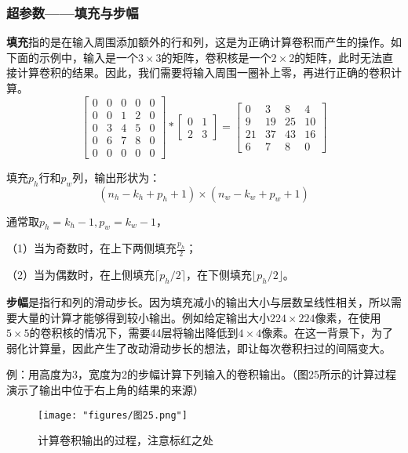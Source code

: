 \subsubsection{超参数——填充与步幅}
\textbf{填充}指的是在输入周围添加额外的行和列，这是为正确计算卷积而产生的操作。如下面的示例中，输入是一个$3\times3$的矩阵，卷积核是一个$2\times2$的矩阵，此时无法直接计算卷积的结果。因此，我们需要将输入周围一圈补上零，再进行正确的卷积计算。
\begin{equation}\begin{bmatrix}0&0&0&0&0\\0&0&1&2&0\\0&3&4&5&0\\0&6&7&8&0\\0&0&0&0&0\end{bmatrix}*\begin{bmatrix}0&1\\2&3\end{bmatrix}=\begin{bmatrix}0&3&8&4\\9&19&25&10\\21&37&43&16\\6&7&8&0\end{bmatrix}\end{equation}

填充$p_{h}$行和$p_{w}$列，输出形状为：
\begin{equation}(n_h-k_h+p_h+1)\times(n_w-k_w+p_w+1)\end{equation}

通常取$p_{h}=k_{h}-1 ,p_{w}=k_{w}-1$，

（1）当为奇数时，在上下两侧填充$\frac{p_{h}}2$；

（2）当为偶数时，在上侧填充$\lceil p_{h}/2\rceil $，在下侧填充$\lfloor p_{h}/2\rfloor $。

\textbf{步幅}是指行和列的滑动步长。因为填充减小的输出大小与层数呈线性相关，所以需要大量的计算才能够得到较小输出。例如给定输出大小$224\times224$像素，在使用$5\times5$的卷积核的情况下，需要44层将输出降低到$4\times4$像素。在这一背景下，为了弱化计算量，因此产生了改动滑动步长的想法，即让每次卷积扫过的间隔变大。

例：用高度为3，宽度为2的步幅计算下列输入的卷积输出。（图25所示的计算过程演示了输出中位于右上角的结果的来源）
\begin{figure}[ht] %
	\centering
	\texttt{[image: "figures/图25.png"]} %
	\caption{计算卷积输出的过程，注意标红之处} %
	\label{fig:example} %
\end{figure}


